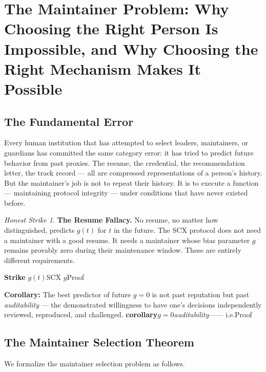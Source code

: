 \documentclass[12pt,a4paper]{article}
\theoremstyle{remark}
\newtheorem{honesthit}{Honest Strike}[section]
\newenvironment{hitbox}{%
  \begin{center}
  \color{critiquered}
  \begin{minipage}{0.92\textwidth}
  \begin{honesthit}
}{%
  \end{honesthit}
  \end{minipage}
  \end{center}
}
\begin{document}
\section{}
\section{The Maintainer Problem: Why Choosing the Right Person Is Impossible, and Why Choosing the Right Mechanism Makes It Possible}

\subsection{The Fundamental Error}

Every human institution that has attempted to select leaders, maintainers,
or guardians has committed the same category error: it has tried to predict
future behavior from past proxies. The resume, the credential, the
recommendation letter, the track record — all are compressed representations
of a person's history. But the maintainer's job is not to repeat their
history. It is to execute a function — maintaining protocol integrity —
under conditions that have never existed before.

\begin{hitbox}
\textbf{The Resume Fallacy.}
No resume, no matter how distinguished, predicts $g(t)$ for $t$ in the future.
The SCX protocol does not need a maintainer with a good resume. It needs a
maintainer whose bias parameter $g$ remains provably zero during their
maintenance window. These are entirely different requirements.

\textbf{Strike}
$g(t)$SCX
$g$Proof

\textbf{Corollary:} The best predictor of future $g=0$ is not past reputation
but past \textit{auditability} — the demonstrated willingness to have one's
decisions independently reviewed, reproduced, and challenged.
\textbf{corollary}$g=0$\textit{auditability}——
i.e.Proof
\end{hitbox}

\subsection{The Maintainer Selection Theorem}

We formalize the maintainer selection problem as follows.
\end{document}
